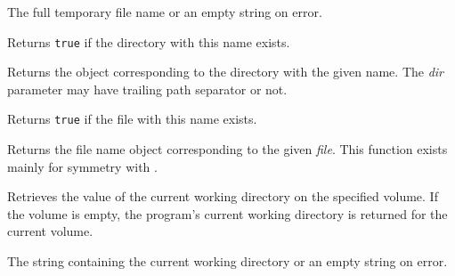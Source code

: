 
The full temporary file name or an empty string on error.


\label{wxfilenamedirexists}



Returns {\tt true} if the directory with this name exists.


\label{wxfilenamedirname}


Returns the object corresponding to the directory with the given name.
The {\it dir} parameter may have trailing path separator or not.



\label{wxfilenamefileexists}



Returns {\tt true} if the file with this name exists.





\label{wxfilenamefilename}


Returns the file name object corresponding to the given {\it file}. This
function exists mainly for symmetry with .



\label{wxfilenamegetcwd}


Retrieves the value of the current working directory on the specified volume. If
the volume is empty, the program's current working directory is returned for the
current volume.


The string containing the current working directory or an empty string on
error.

